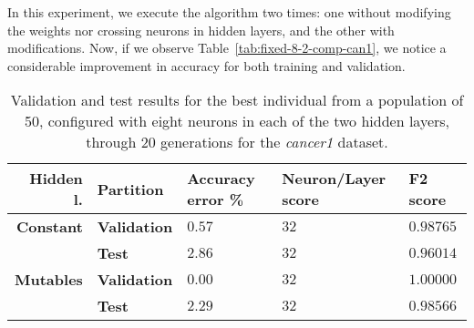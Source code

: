 \documentclass[runningheads]{llncs}
\begin{document}

In this experiment, we execute the algorithm two times: one without modifying
the weights nor crossing neurons in hidden layers, and the other with
modifications. %
Now, if we observe Table~\autoref{tab:fixed-8-2-comp-can1}, we
notice a considerable improvement in accuracy for both training and
validation. %

\begin{table}
    \centering
    \caption{
Validation and test results for the best individual from a population of 50,
configured with eight neurons in each of the two hidden layers, through 20
generations for the \emph{cancer1} dataset.}
     \label{tab:fixed-8-2-comp-can1}
     \begin{tabular}{rllll}
         \textbf{Hidden l.} & \textbf{Partition}  & \textbf{Accuracy error \%} & \textbf{Neuron/Layer score} & \textbf{F2 score} \\
         \hline
         \textbf{Constant}  & \textbf{Validation} & $0.57$                 &        $32$             &      $0.98765$ \\
                        & \textbf{Test}       & $2.86$                 &        $32$             &      $0.96014$ \\
         \textbf{Mutables}  & \textbf{Validation} & $0.00$                 &        $32$             &      $1.00000$ \\
                        & \textbf{Test}       & $2.29$                 &        $32$             &      $0.98566$ \\
     \end{tabular}
 \end{table}

\end{document}
